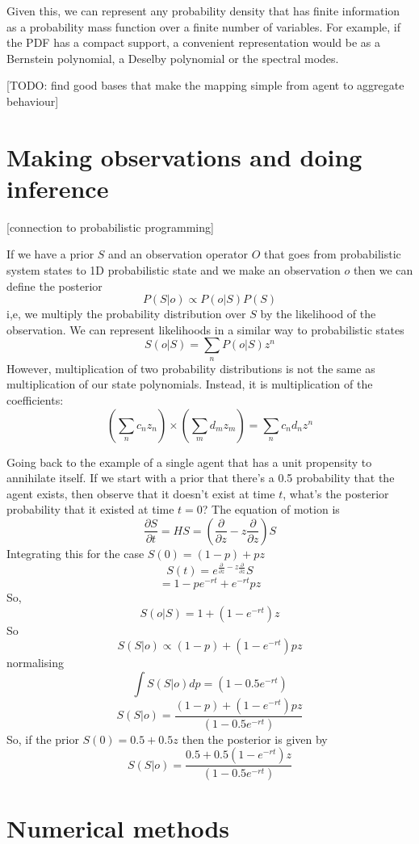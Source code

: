 \documentclass[letterpaper,twocolumn,10pt]{article}
\begin{document}
Given this, we can represent any probability density that has finite information as a probability mass function over a finite number of variables. For example, if the PDF has a compact support, a convenient representation would be as a Bernstein polynomial, a Deselby polynomial or the spectral modes.

[TODO: find good bases that make the mapping simple from agent to aggregate behaviour]

\section{Making observations and doing inference}

[connection to probabilistic programming]

If we have a prior $S$ and an observation operator $O$ that goes from probabilistic system states to 1D probabilistic state and we make an observation $o$ then we can define the posterior
\[
P(S|o) \propto P(o|S)P(S)
\]
i,e, we multiply the probability distribution over $S$ by the likelihood of the observation. We can represent likelihoods in a similar way to probabilistic states
\[
S(o|S) = \sum_n P(o|S)z^n
\]
However, multiplication of two probability distributions is not the same as multiplication of our state polynomials. Instead, it is multiplication of the coefficients:
\[
\left(\sum_n c_n z_n\right) \times \left(\sum_m d_mz_m\right) = \sum_n c_nd_nz^n
\]

Going back to the example of a single agent that has a unit propensity to annihilate itself. If we start with a prior that there's a 0.5 probability that the agent exists, then observe that it doesn't exist at time $t$, what's the posterior probability that it existed at time $t=0$? The equation of motion is
\[
\frac{\partial S}{\partial t} = HS = \left(\frac{\partial}{\partial z} - z \frac{\partial }{\partial z}\right)S
\]
Integrating this for the case $S(0) = (1-p) + pz$
\[
S(t) = e^{\frac{\partial}{\partial z} - z \frac{\partial }{\partial z}}S
\]
\[
= 1-pe^{-rt} + e^{-rt}pz
\]
So,
\[
S(o|S) = 1 + (1-e^{-rt})z
\]
So
\[
S(S|o) \propto (1-p) + (1-e^{-rt})pz
\]
normalising
\[
\int S(S|o) dp = (1-0.5e^{-rt})
\]
\[
S(S|o) = \frac{(1-p) + (1-e^{-rt})pz}{(1-0.5e^{-rt})}
\]
So, if the prior $S(0) = 0.5 + 0.5z$ then the posterior is given by
\[
S(S|o) = \frac{0.5 + 0.5(1-e^{-rt})z}{(1-0.5e^{-rt})}
\]

\section{Numerical methods}
\end{document}
